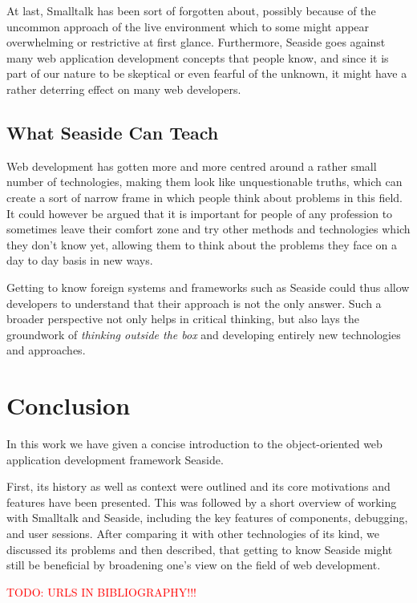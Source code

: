 \documentclass[a4paper,12pt,pagesize,headsepline,oribibl,titlepage]{scrartcl}
\newcommand{\todo}[1]{\textcolor{red}{TODO: #1}\PackageWarning{TODO:}{#1!}}
\begin{document}
At last, Smalltalk has been sort of forgotten about, possibly because of the uncommon approach of the live environment which to some might appear overwhelming or restrictive at first glance. Furthermore, Seaside goes against many web application development concepts that people know, and since it is part of our nature to be skeptical or even fearful of the unknown, it might have a rather deterring effect on many web developers.


\subsection{What Seaside Can Teach}

Web development has gotten more and more centred around a rather small number of technologies, making them look like unquestionable truths, which can create a sort of narrow frame in which people think about problems in this field. 
It could however be argued that it is important for people of any profession to sometimes leave their comfort zone and try other methods and technologies which they don't know yet, allowing them to think about the problems they face on a day to day basis in new ways.

Getting to know foreign systems and frameworks such as Seaside could thus allow developers to understand that their approach is not the only answer. Such a broader perspective not only helps in critical thinking, but also lays the groundwork of \emph{thinking outside the box} and developing entirely new technologies and approaches.

\section{Conclusion}
\label{sec:conclusion}

In this work we have given a concise introduction to the object-oriented web application development framework Seaside. 

First, its history as well as context were outlined and its core motivations and features have been presented. This was followed by a short overview of working with Smalltalk and Seaside, including the key features of components, debugging, and user sessions. After comparing it with other technologies of its kind, we discussed its problems and then described, that getting to know Seaside might still be beneficial by broadening one's view on the field of web development.

\todo{URLS IN BIBLIOGRAPHY!!!}

\newpage
\nocite{*}


\end{document}
